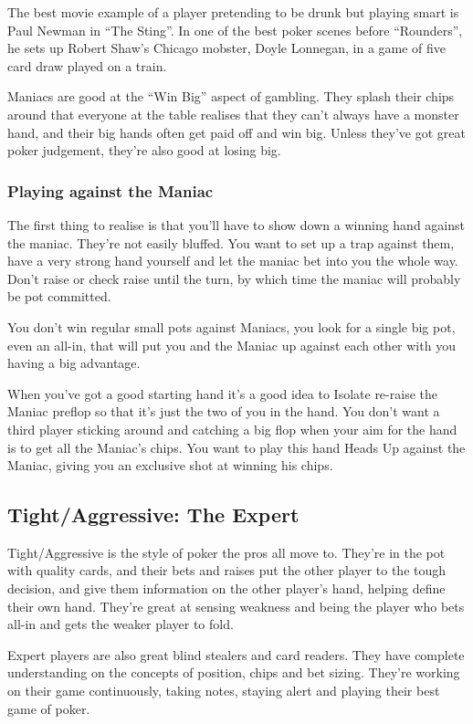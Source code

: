 The best movie example of a player pretending to be drunk but playing
smart is Paul Newman in ``The Sting''. In one of the best poker scenes
before ``Rounders'', he sets up Robert Shaw's Chicago mobster,
Doyle Lonnegan, in a game of five card draw played on a train.

Maniacs are good at the ``Win Big'' aspect of gambling. They splash
their chips around that everyone at the table realises that they
can't always have a monster hand, and their big hands often get
paid off and win big. Unless they've got great poker judgement, they're
also good at losing big.

\subsubsection{Playing against the Maniac}

The first thing to realise is that you'll have to show down a winning
hand against the maniac. They're not easily bluffed. You want to set up a
trap against them, have a very strong hand yourself and let the maniac
bet into you the whole way. Don't raise or check raise until
the turn, by which time the maniac will probably be pot committed.

You don't win regular small pots against Maniacs, you look for a single big
pot, even an all-in, that will put you and the Maniac up against each
other with you having a big advantage.

When you've got a good starting hand it's a good idea to Isolate
re-raise the
Maniac preflop so that it's just the two of you in the hand. You don't
want a third player sticking around and catching a big flop when your
aim for the hand is to get all the Maniac's chips.
You want to play this hand Heads Up against the Maniac,
giving you an exclusive shot at winning his chips.

\subsection{Tight/Aggressive: The Expert}

Tight/Aggressive is the style of poker the pros all move to. They're
in the pot with quality cards, and their bets and raises put the
other player to the tough decision, and give them information on
the other player's hand, helping define their own hand. They're great
at sensing weakness and being the player who bets all-in and gets
the weaker player to fold.

Expert players are also great blind stealers and card readers.
They have complete understanding on
the concepts of position, chips and bet sizing. They're working on
their game continuously, taking notes, staying alert and playing
their best game of poker.

